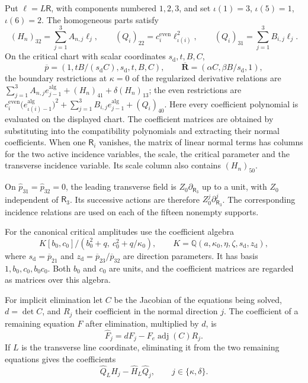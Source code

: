 \documentclass[11pt,a4paper]{article}
\numberwithin{equation}{section}
\theoremstyle{plain}
\theoremstyle{definition}
\theoremstyle{remark}
\begin{document}
Put $\ell=L\mathsf R$, with components numbered $1,2,3$, and
set $\iota(1)=3$, $\iota(5)=1$, $\iota(6)=2$. The homogeneous parts satisfy
\[
 (H_n)_{32}=\sum_{j=1}^3 A_{n,j}\ell_j,\qquad
 (Q_i)_{22}=c_i^{\mathrm{even}}\ell_{\iota(i)}^2,\qquad
 (Q_i)_{31}=\sum_{j=1}^3B_{i,j}\ell_j.
\]
On the critical chart with scalar coordinates $s_{\mathrm d},t,B,C$,
\[
 \overline p=(1,tB/(s_{\mathrm d}C),s_{\mathrm d},t,B,C),\qquad
 \overline{\boldsymbol R}=(\alpha C,\beta B/s_{\mathrm d},1),
\]
the boundary restrictions at $\kappa=0$ of the regularized derivative
relations are $\sum_{j=1}^3A_{n,j}e_{j-1}^{\mathrm{alg}}+(H_n)_{41}+\delta(H_n)_{13}$;
the even restrictions are
$c_i^{\mathrm{even}}\bigl(e_{\iota(i)-1}^{\mathrm{alg}}\bigr)^2+\sum_{j=1}^3B_{i,j}e_{j-1}^{\mathrm{alg}}+(Q_i)_{40}$.
Here every coefficient polynomial is evaluated on the displayed chart.
The coefficient matrices are obtained by substituting into the
compatibility polynomials and extracting their normal coefficients. When one $\mathsf R_i$ vanishes,
the matrix of linear normal terms has columns for the two active incidence
variables, the scale, the critical parameter and the transverse
incidence variable. Its scale column also contains $(H_n)_{50}$.

On $\widehat p_{31}=\widehat p_{32}=0$, the leading transverse
field is $Z_0\partial_{\mathsf R_3}$ up to a unit, with $Z_0$
independent of $\mathsf R_3$. Its successive actions are therefore
$Z_0^j\partial_{\mathsf R_3}^j$. The corresponding incidence relations
are used on each of the fifteen nonempty supports.

For the canonical critical amplitudes use the coefficient algebra
\[
 K[b_0,c_0]/(b_0^2+q,\ c_0^2+q/\kappa_0),\qquad
 K=\mathbb Q(a,\kappa_0,\eta,\zeta,s_{\mathrm d},z_{\mathrm d}),
\]
where $s_{\mathrm d}=\overline p_{21}$ and $z_{\mathrm d}=\overline p_{23}/\overline p_{32}$ are direction parameters. It has basis $1,b_0,c_0,b_0c_0$.
Both $b_0$ and $c_0$ are units, and the coefficient matrices are
regarded as matrices over this algebra.

For implicit elimination let $C$ be the Jacobian of the equations
being solved, $d=\det C$, and $R_j$ their coefficient in the normal
direction $j$. The coefficient of a remaining equation $F$ after
elimination, multiplied by $d$, is
\[
 \widehat F_j=dF_j-F_e\operatorname{adj}(C)R_j.
\]
If $L$ is the transverse line coordinate, eliminating it from the
two remaining equations gives the coefficients
\[
 \widehat Q_L\widehat H_j-\widehat H_L\widehat Q_j,
 \qquad j\in\{\kappa,\delta\}.
\]
\end{document}
